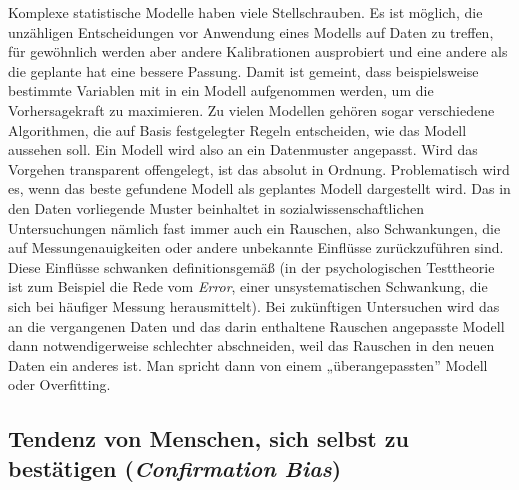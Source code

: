 \documentclass[
  letterpaper,
  DIV=11,
  numbers=noendperiod]{scrreprt}
\begin{document}
Komplexe statistische Modelle haben viele Stellschrauben. Es ist
möglich, die unzähligen Entscheidungen vor Anwendung eines Modells auf
Daten zu treffen, für gewöhnlich werden aber andere Kalibrationen
ausprobiert und eine andere als die geplante hat eine bessere Passung.
Damit ist gemeint, dass beispielsweise bestimmte Variablen mit in ein
Modell aufgenommen werden, um die Vorhersagekraft zu maximieren. Zu
vielen Modellen gehören sogar verschiedene Algorithmen, die auf Basis
festgelegter Regeln entscheiden, wie das Modell aussehen soll. Ein
Modell wird also an ein Datenmuster angepasst. Wird das Vorgehen
transparent offengelegt, ist das absolut in Ordnung. Problematisch wird
es, wenn das beste gefundene Modell als geplantes Modell dargestellt
wird. Das in den Daten vorliegende Muster beinhaltet in
sozialwissenschaftlichen Untersuchungen nämlich fast immer auch ein
Rauschen, also Schwankungen, die auf Messungenauigkeiten oder andere
unbekannte Einflüsse zurückzuführen sind. Diese Einflüsse schwanken
definitionsgemäß (in der psychologischen Testtheorie ist zum Beispiel
die Rede vom \emph{Error}, einer unsystematischen Schwankung, die sich
bei häufiger Messung herausmittelt). Bei zukünftigen Untersuchen wird
das an die vergangenen Daten und das darin enthaltene Rauschen
angepasste Modell dann notwendigerweise schlechter abschneiden, weil das
Rauschen in den neuen Daten ein anderes ist. Man spricht dann von einem
„überangepassten'' Modell oder Overfitting.

\subsection{\texorpdfstring{Tendenz von Menschen, sich selbst zu
bestätigen (\emph{Confirmation
Bias})}{Tendenz von Menschen, sich selbst zu bestätigen (Confirmation Bias)}}\label{tendenz-von-menschen-sich-selbst-zu-bestuxe4tigen-confirmation-bias}
\end{document}
